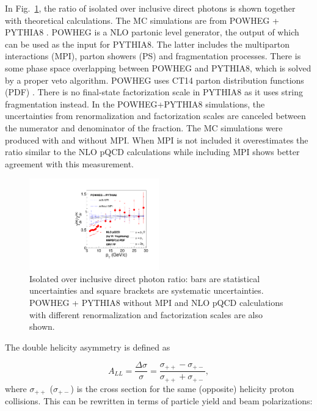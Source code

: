 \documentclass[twocolumn,letterpaper,aps,prl,longbibliography,superscriptaddress,floatfix]{revtex4-2}
\begin{document}
In Fig.~\ref{fig:iso2inc}, the ratio of isolated over inclusive direct photons is shown together with theoretical calculations. The MC simulations are from POWHEG + PYTHIA8 \cite{Nason_2004, Frixione_2007, Alioli2010, Jezo2016, Klasen2018}. POWHEG is a NLO partonic level generator, the output of which can be used as the input for PYTHIA8. The latter includes the multiparton interactions (MPI), parton showers (PS) and fragmentation processes. There is some phase space overlapping between POWHEG and PYTHIA8, which is solved by a proper veto algorithm. POWHEG uses CT14 parton distribution functions (PDF) \cite{PhysRevD.93.033006}. There is no final-state factorization scale in PYTHIA8 as it uses string fragmentation instead. In the POWHEG+PYTHIA8 simulations, the uncertainties from renormalization and factorization scales are canceled between the numerator and denominator of the fraction. The MC simulations were produced with and without MPI. When MPI is not included it overestimates the ratio similar to the NLO pQCD calculations while including MPI shows better agreement with this measurement.

\begin{figure}
\centering
\includegraphics[width=0.5\textwidth]{Iso2Inc}
\caption{Isolated over inclusive direct photon ratio: bars are statistical uncertainties and square brackets are systematic uncertainties. POWHEG + PYTHIA8 without MPI and NLO pQCD calculations with different renormalization and factorization scales are also shown.}
\label{fig:iso2inc}
\end{figure}

The double helicity asymmetry is defined as

\begin{equation} \label{eq:all}
A_{LL} = \frac{\Delta\sigma}{\sigma} = \frac{\sigma_{++}-\sigma_{+-}}{\sigma_{++}+\sigma_{+-}},
\end{equation}
where $\sigma_{++}$ ($\sigma_{+-}$) is the cross section for the same (opposite) helicity proton collisions. This can be rewritten in terms of particle yield and beam polarizations:
\end{document}
